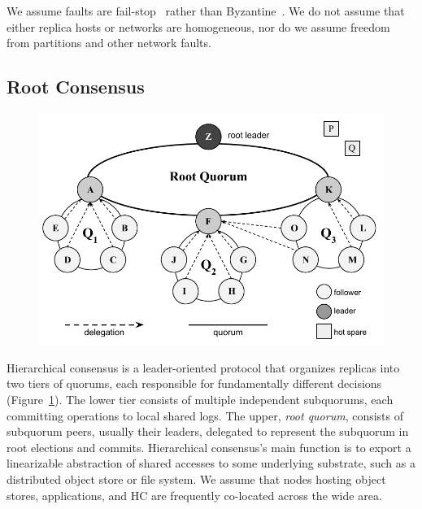 We assume faults are fail-stop~\cite{fail-stop} rather than Byzantine~\cite{byzantine-generals}.
We do not assume that either replica hosts or networks are homogeneous, nor do we assume freedom from partitions and other network faults.


\subsection{Root Consensus}

\begin{figure}
    \begin{center}
        \includegraphics[width=5in]{figures/ch03_election.pdf}
    \end{center}
    \renewcommand{\baselinestretch}{1}
    \small\normalsize

    \begin{quote}
        \caption[Delegated Votes]{}
        \label{fig:ch03_tiers}
    \end{quote}
\end{figure}
\renewcommand{\baselinestretch}{2}
\small\normalsize

Hierarchical consensus is a leader-oriented protocol that organizes replicas into two tiers of quorums, each responsible for fundamentally different decisions (Figure~\ref{fig:ch03_tiers}).
The lower tier consists of multiple independent subquorums, each committing operations to local shared logs.
The upper,  \emph{root quorum}, consists of subquorum peers, usually their leaders, delegated to represent the subquorum in root elections and commits.
Hierarchical consensus's main function is to export a linearizable abstraction of shared accesses to some underlying substrate, such as a distributed object store or file system.
We assume that nodes hosting object stores, applications, and HC are frequently co-located across the wide area.

